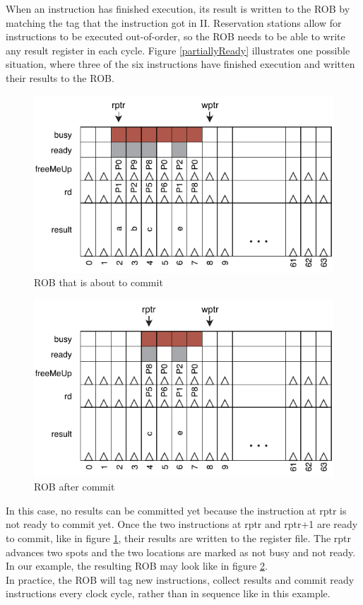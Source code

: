 \documentclass[12pt,a4paper]{article} %
\begin{document}
When an instruction has finished execution, its result is written to the ROB by matching the tag that the instruction got in II. Reservation stations allow for instructions to be executed out-of-order, so the ROB needs to be able to write any result register in each cycle. Figure \ref{partiallyReady} illustrates one possible situation, where three of the six instructions have finished execution and written their results to the ROB.
\begin{figure}[H]
	\includegraphics[width=\textwidth]{Source/ROB/ROB-Ready.pdf}
	\caption{ROB that is about to commit} 
	\label{aboutToCommit}
\end{figure}%
\begin{figure}[H]
	\includegraphics[width=\textwidth]{Source/ROB/ROB-AfterCommit.pdf}
	\caption{ROB after commit} 
	\label{afterCommit}
\end{figure}%
In this case, no results can be committed yet because the instruction at rptr is not ready to commit yet. Once the two instructions at rptr and rptr+1 are ready to commit, like in figure \ref{aboutToCommit}, their results are written to the register file. The rptr advances two spots and the two locations are marked as not busy and not ready. In our example, the resulting ROB may look like in figure \ref{afterCommit}.\\
In practice, the ROB will tag new instructions, collect results and commit ready instructions every clock cycle, rather than in sequence like in this example. \\
\end{document}
